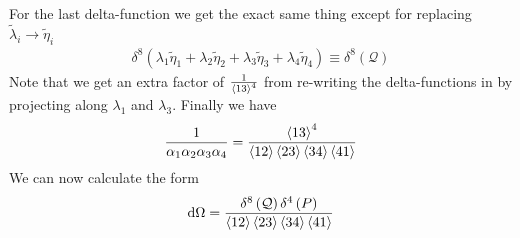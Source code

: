 \documentclass[a4paper,12pt]{article}
\begin{document}
For the last delta-function we get the exact same thing except for replacing $\tilde \lambda_i\to \tilde \eta_i$
\begin{equation}
	\begin{aligned}
		\delta^{8}(\lambda_1\tilde\eta_1+\lambda_2\tilde\eta_2+\lambda_3\tilde\eta_3+\lambda_4\tilde\eta_4)\equiv \delta^{8}\left(\mathcal{Q}\right)
	\end{aligned}
\end{equation}
Note that we get an extra factor of $\frac{1}{\expval{13}^4}$ from re-writing the delta-functions in by projecting along $\lambda_1$ and $\lambda_3$.
 Finally we have
\begin{equation}
	\begin{aligned}
		\frac{1}{\alpha_1 \alpha_2 \alpha_3 \alpha_4}=\frac{\expval{13}^4}{\expval{12}\expval{23}\expval{34}\expval{41}}
	\end{aligned}
\end{equation}
We can now calculate the form
\begin{equation}
	\begin{aligned}
		\dd \Omega =
		\frac{\delta^{8}\left(\mathcal{Q}\right)\delta^{4}\left(P\right)}{\expval{12}\expval{23}\expval{34}\expval{41}}
	\end{aligned}
\end{equation}
\end{document}
